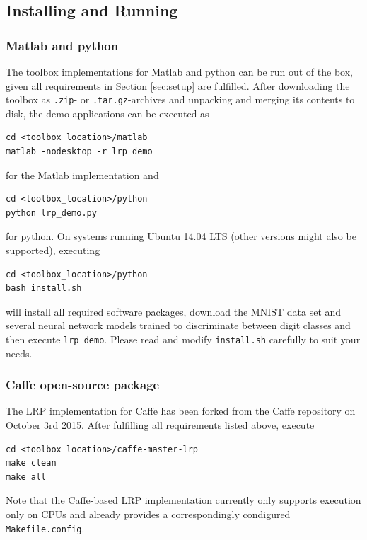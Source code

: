 \documentclass[a4wide]{article}
\begin{document}
\subsection*{Installing and Running}
\subsubsection*{Matlab and python}
The toolbox implementations for Matlab and python can be run out of the box, given all requirements in Section \ref{sec:setup} are fulfilled. After downloading the toolbox as \texttt{.zip}- or \texttt{.tar.gz}-archives and unpacking and merging its contents to disk, the demo applications can be executed as
\begin{Verbatim}[frame = single]
cd <toolbox_location>/matlab
matlab -nodesktop -r lrp_demo
\end{Verbatim}
for the Matlab implementation and
\begin{Verbatim}[frame = single]
cd <toolbox_location>/python
python lrp_demo.py
\end{Verbatim}
for python. On systems running Ubuntu 14.04 LTS (other versions might also be supported), executing
\begin{Verbatim}[frame = single]
cd <toolbox_location>/python
bash install.sh
\end{Verbatim}
will install all required software packages, download the MNIST \cite{lecun1998mnist} data set and several neural network models trained to discriminate between digit classes and then execute \texttt{lrp\_demo}. Please read and modify \texttt{install.sh} carefully to suit your needs.

\subsubsection*{Caffe open-source package}

The LRP implementation for Caffe has been forked from the Caffe repository on October 3rd 2015. After fulfilling all requirements listed above, execute
\begin{Verbatim}[frame = single]
cd <toolbox_location>/caffe-master-lrp
make clean
make all
\end{Verbatim}
Note that the Caffe-based LRP implementation currently only supports execution only on CPUs and already provides a correspondingly condigured \texttt{Makefile.config}.
\end{document}
